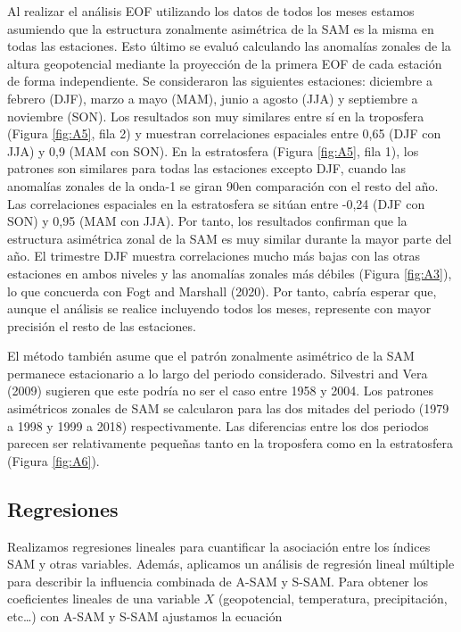 \documentclass[12pt,oneside]{reedthesis}
\begin{document}
Al realizar el análisis EOF utilizando los datos de todos los meses estamos asumiendo que la estructura zonalmente asimétrica de la SAM es la misma en todas las estaciones.
Esto último se evaluó calculando las anomalías zonales de la altura geopotencial mediante la proyección de la primera EOF de cada estación de forma independiente.
Se consideraron las siguientes estaciones: diciembre a febrero (DJF), marzo a mayo (MAM), junio a agosto (JJA) y septiembre a noviembre (SON).
Los resultados son muy similares entre sí en la troposfera (Figura \ref{fig:A5}, fila 2) y muestran correlaciones espaciales entre 0,65 (DJF con JJA) y 0,9 (MAM con SON).
En la estratosfera (Figura \ref{fig:A5}, fila 1), los patrones son similares para todas las estaciones excepto DJF, cuando las anomalías zonales de la onda-1 se giran 90\degree en comparación con el resto del año.
Las correlaciones espaciales en la estratosfera se sitúan entre -0,24 (DJF con SON) y 0,95 (MAM con JJA).
Por tanto, los resultados confirman que la estructura asimétrica zonal de la SAM es muy similar durante la mayor parte del año.
El trimestre DJF muestra correlaciones mucho más bajas con las otras estaciones en ambos niveles y las anomalías zonales más débiles (Figura \ref{fig:A3}), lo que concuerda con Fogt and Marshall (2020).
Por tanto, cabría esperar que, aunque el análisis se realice incluyendo todos los meses, represente con mayor precisión el resto de las estaciones.

El método también asume que el patrón zonalmente asimétrico de la SAM permanece estacionario a lo largo del periodo considerado.
Silvestri and Vera (2009) sugieren que este podría no ser el caso entre 1958 y 2004.
Los patrones asimétricos zonales de SAM se calcularon para las dos mitades del periodo (1979 a 1998 y 1999 a 2018) respectivamente.
Las diferencias entre los dos periodos parecen ser relativamente pequeñas tanto en la troposfera como en la estratosfera (Figura \ref{fig:A6}).

\hypertarget{regresiones}{%
\subsection{Regresiones}\label{regresiones}}

Realizamos regresiones lineales para cuantificar la asociación entre los índices SAM y otras variables.
Además, aplicamos un análisis de regresión lineal múltiple para describir la influencia combinada de A\nobreakdash-SAM y S\nobreakdash-SAM.
Para obtener los coeficientes lineales de una variable \(X\) (geopotencial, temperatura, precipitación, etc\ldots) con A\nobreakdash-SAM y S\nobreakdash-SAM ajustamos la ecuación
\end{document}
